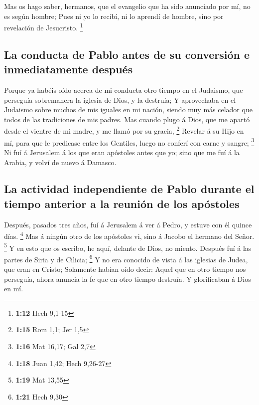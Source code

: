  Mas os hago saber, hermanos, que el evangelio que ha sido
anunciado por mí, no es según hombre;  Pues ni yo lo
recibí, ni lo aprendí de hombre, sino por revelación de Jesucristo.
\footnote{\textbf{1:12} Hech 9,1-15}

\hypertarget{la-conducta-de-pablo-antes-de-su-conversiuxf3n-e-inmediatamente-despuuxe9s}{%
\subsection{La conducta de Pablo antes de su conversión e inmediatamente
después}\label{la-conducta-de-pablo-antes-de-su-conversiuxf3n-e-inmediatamente-despuuxe9s}}

 Porque ya habéis oído acerca de mi conducta otro tiempo en
el Judaismo, que perseguía sobremanera la iglesia de Dios, y la
destruía;  Y aprovechaba en el Judaismo sobre muchos de mis
iguales en mi nación, siendo muy más celador que todos de las
tradiciones de mis padres.  Mas cuando plugo á Dios, que me
apartó desde el vientre de mi madre, y me llamó por su gracia,
\footnote{\textbf{1:15} Rom 1,1; Jer 1,5}  Revelar á su
Hijo en mí, para que le predicase entre los Gentiles, luego no conferí
con carne y sangre; \footnote{\textbf{1:16} Mat 16,17; Gal 2,7}
 Ni fuí á Jerusalem á los que eran apóstoles antes que yo;
sino que me fuí á la Arabia, y volví de nuevo á Damasco.

\hypertarget{la-actividad-independiente-de-pablo-durante-el-tiempo-anterior-a-la-reuniuxf3n-de-los-apuxf3stoles}{%
\subsection{La actividad independiente de Pablo durante el tiempo
anterior a la reunión de los
apóstoles}\label{la-actividad-independiente-de-pablo-durante-el-tiempo-anterior-a-la-reuniuxf3n-de-los-apuxf3stoles}}

 Después, pasados tres años, fuí á Jerusalem á ver á Pedro,
y estuve con él quince días. \footnote{\textbf{1:18} Juan 1,42; Hech
  9,26-27}  Mas á ningún otro de los apóstoles vi, sino á
Jacobo el hermano del Señor. \footnote{\textbf{1:19} Mat 13,55}
 Y en esto que os escribo, he aquí, delante de Dios, no
miento.  Después fuí á las partes de Siria y de Cilicia;
\footnote{\textbf{1:21} Hech 9,30}  Y no era conocido de
vista á las iglesias de Judea, que eran en Cristo; 
Solamente habían oído decir: Aquel que en otro tiempo nos perseguía,
ahora anuncia la fe que en otro tiempo destruía.  Y
glorificaban á Dios en mí.


